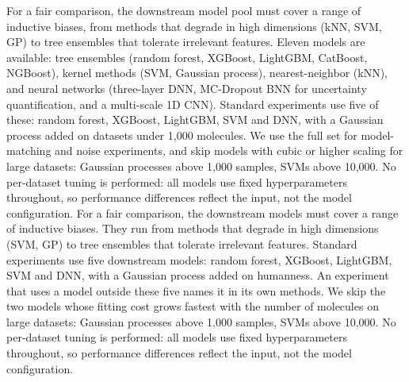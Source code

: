 
For a fair comparison, the downstream model pool must cover a range of inductive biases, from methods that degrade in high dimensions (kNN, SVM, GP) to tree ensembles that tolerate irrelevant features. Eleven models are available: tree ensembles (random forest, XGBoost, LightGBM, CatBoost, NGBoost), kernel methods (SVM, Gaussian process), nearest-neighbor (kNN), and neural networks (three-layer DNN, MC-Dropout BNN for uncertainty quantification, and a multi-scale 1D CNN). Standard experiments use five of these: random forest, XGBoost, LightGBM, SVM and DNN, with a Gaussian process added on datasets under 1,000 molecules. We use the full set for model-matching and noise experiments, and skip models with cubic or higher scaling for large datasets: Gaussian processes above 1,000 samples, SVMs above 10,000. No per-dataset tuning is performed: all models use fixed hyperparameters throughout, so performance differences reflect the input, not the model configuration.
For a fair comparison, the downstream models must cover a range of inductive biases. They run from methods that degrade in high dimensions (SVM, GP) to tree ensembles that tolerate irrelevant features. Standard experiments use five downstream models: random forest, XGBoost, LightGBM, SVM and DNN, with a Gaussian process added on humanness. An experiment that uses a model outside these five names it in its own methods. We skip the two models whose fitting cost grows fastest with the number of molecules on large datasets: Gaussian processes above 1,000 samples, SVMs above 10,000. No per-dataset tuning is performed: all models use fixed hyperparameters throughout, so performance differences reflect the input, not the model configuration.


